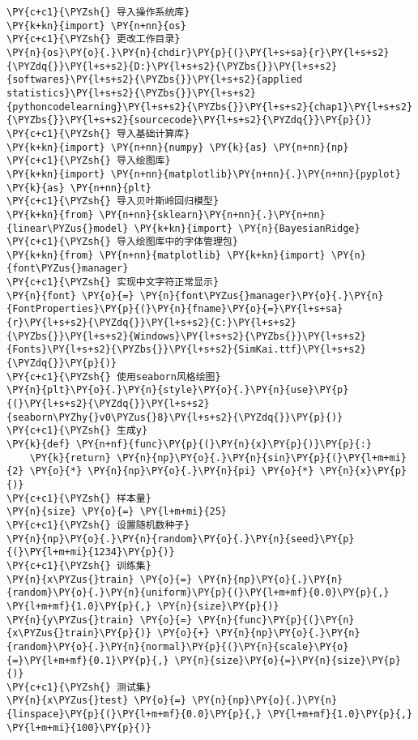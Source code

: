 \begin{Verbatim}[commandchars=\\\{\}]
\PY{c+c1}{\PYZsh{} 导入操作系统库}
\PY{k+kn}{import} \PY{n+nn}{os}
\PY{c+c1}{\PYZsh{} 更改工作目录}
\PY{n}{os}\PY{o}{.}\PY{n}{chdir}\PY{p}{(}\PY{l+s+sa}{r}\PY{l+s+s2}{\PYZdq{}}\PY{l+s+s2}{D:}\PY{l+s+s2}{\PYZbs{}}\PY{l+s+s2}{softwares}\PY{l+s+s2}{\PYZbs{}}\PY{l+s+s2}{applied statistics}\PY{l+s+s2}{\PYZbs{}}\PY{l+s+s2}{pythoncodelearning}\PY{l+s+s2}{\PYZbs{}}\PY{l+s+s2}{chap1}\PY{l+s+s2}{\PYZbs{}}\PY{l+s+s2}{sourcecode}\PY{l+s+s2}{\PYZdq{}}\PY{p}{)}
\PY{c+c1}{\PYZsh{} 导入基础计算库}
\PY{k+kn}{import} \PY{n+nn}{numpy} \PY{k}{as} \PY{n+nn}{np}
\PY{c+c1}{\PYZsh{} 导入绘图库}
\PY{k+kn}{import} \PY{n+nn}{matplotlib}\PY{n+nn}{.}\PY{n+nn}{pyplot} \PY{k}{as} \PY{n+nn}{plt}
\PY{c+c1}{\PYZsh{} 导入贝叶斯岭回归模型}
\PY{k+kn}{from} \PY{n+nn}{sklearn}\PY{n+nn}{.}\PY{n+nn}{linear\PYZus{}model} \PY{k+kn}{import} \PY{n}{BayesianRidge}
\PY{c+c1}{\PYZsh{} 导入绘图库中的字体管理包}
\PY{k+kn}{from} \PY{n+nn}{matplotlib} \PY{k+kn}{import} \PY{n}{font\PYZus{}manager}
\PY{c+c1}{\PYZsh{} 实现中文字符正常显示}
\PY{n}{font} \PY{o}{=} \PY{n}{font\PYZus{}manager}\PY{o}{.}\PY{n}{FontProperties}\PY{p}{(}\PY{n}{fname}\PY{o}{=}\PY{l+s+sa}{r}\PY{l+s+s2}{\PYZdq{}}\PY{l+s+s2}{C:}\PY{l+s+s2}{\PYZbs{}}\PY{l+s+s2}{Windows}\PY{l+s+s2}{\PYZbs{}}\PY{l+s+s2}{Fonts}\PY{l+s+s2}{\PYZbs{}}\PY{l+s+s2}{SimKai.ttf}\PY{l+s+s2}{\PYZdq{}}\PY{p}{)}
\PY{c+c1}{\PYZsh{} 使用seaborn风格绘图}
\PY{n}{plt}\PY{o}{.}\PY{n}{style}\PY{o}{.}\PY{n}{use}\PY{p}{(}\PY{l+s+s2}{\PYZdq{}}\PY{l+s+s2}{seaborn\PYZhy{}v0\PYZus{}8}\PY{l+s+s2}{\PYZdq{}}\PY{p}{)}
\PY{c+c1}{\PYZsh{} 生成y}
\PY{k}{def} \PY{n+nf}{func}\PY{p}{(}\PY{n}{x}\PY{p}{)}\PY{p}{:}
    \PY{k}{return} \PY{n}{np}\PY{o}{.}\PY{n}{sin}\PY{p}{(}\PY{l+m+mi}{2} \PY{o}{*} \PY{n}{np}\PY{o}{.}\PY{n}{pi} \PY{o}{*} \PY{n}{x}\PY{p}{)}
\PY{c+c1}{\PYZsh{} 样本量}
\PY{n}{size} \PY{o}{=} \PY{l+m+mi}{25}
\PY{c+c1}{\PYZsh{} 设置随机数种子}
\PY{n}{np}\PY{o}{.}\PY{n}{random}\PY{o}{.}\PY{n}{seed}\PY{p}{(}\PY{l+m+mi}{1234}\PY{p}{)}
\PY{c+c1}{\PYZsh{} 训练集}
\PY{n}{x\PYZus{}train} \PY{o}{=} \PY{n}{np}\PY{o}{.}\PY{n}{random}\PY{o}{.}\PY{n}{uniform}\PY{p}{(}\PY{l+m+mf}{0.0}\PY{p}{,} \PY{l+m+mf}{1.0}\PY{p}{,} \PY{n}{size}\PY{p}{)}
\PY{n}{y\PYZus{}train} \PY{o}{=} \PY{n}{func}\PY{p}{(}\PY{n}{x\PYZus{}train}\PY{p}{)} \PY{o}{+} \PY{n}{np}\PY{o}{.}\PY{n}{random}\PY{o}{.}\PY{n}{normal}\PY{p}{(}\PY{n}{scale}\PY{o}{=}\PY{l+m+mf}{0.1}\PY{p}{,} \PY{n}{size}\PY{o}{=}\PY{n}{size}\PY{p}{)}
\PY{c+c1}{\PYZsh{} 测试集}
\PY{n}{x\PYZus{}test} \PY{o}{=} \PY{n}{np}\PY{o}{.}\PY{n}{linspace}\PY{p}{(}\PY{l+m+mf}{0.0}\PY{p}{,} \PY{l+m+mf}{1.0}\PY{p}{,} \PY{l+m+mi}{100}\PY{p}{)}

\end{Verbatim}
